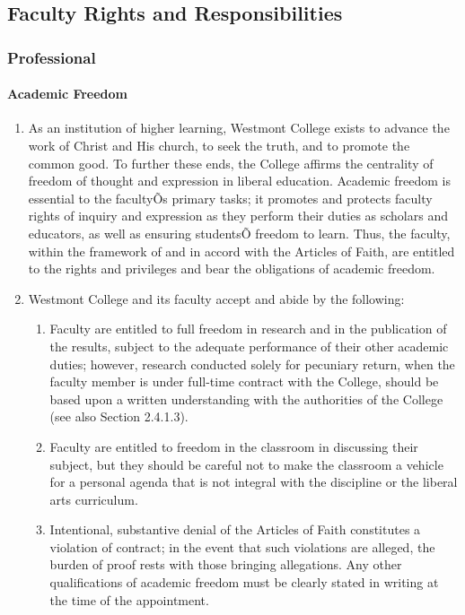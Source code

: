\documentclass[letterpaper, 11pt]{article}
\begin{document}
	\subsection{Faculty Rights and Responsibilities}
		\subsubsection{Professional}
			\paragraph{Academic Freedom}
				\begin{enumerate}[label=\alph*)]
					\item{As an institution of higher learning, Westmont College exists to advance the work of Christ and His church, to seek the truth, and to promote the common good.  To further these ends, the College affirms the centrality of freedom of thought and expression in liberal education.  Academic freedom is essential to the facultyÕs primary tasks; it promotes and protects faculty rights of inquiry and expression as they perform their duties as scholars and educators, as well as ensuring studentsÕ freedom to learn.  Thus, the faculty, within the framework of and in accord with the Articles of Faith, are entitled to the rights and privileges and bear the obligations of academic freedom.}
					\item{Westmont College and its faculty accept and abide by the following:
						\begin{enumerate}[label=\arabic*)]
							\item{Faculty are entitled to full freedom in research and in the publication of the results, subject to the adequate performance of their other academic duties; however, research conducted solely for pecuniary return, when the faculty member is under full-time contract with the College, should be based upon a written understanding with the authorities of the College (see also Section 2.4.1.3).}
							\item{Faculty are entitled to freedom in the classroom in discussing their subject, but they should be careful not to make the classroom a vehicle for a personal agenda that is not integral with the discipline or the liberal arts curriculum.}
							\item{Intentional, substantive denial of the Articles of Faith constitutes a violation of contract; in the event that such violations are alleged, the burden of proof rests with those bringing allegations.  Any other qualifications of academic freedom must be clearly stated in writing at the time of the appointment.}

\end{enumerate}}
\end{enumerate}
\end{document}
